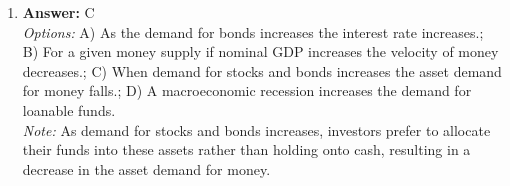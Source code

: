 \documentclass[12pt]{article}
\begin{document}
\begin{enumerate}[label=\arabic*.]
\\ \textit{Note:} When the price of good X, a close substitute for good Z, rises, consumers will shift their demand from good X to good Z, leading to an increase in both the equilibrium price and quantity of good Z.
\item \textbf{Answer:} C
\\ \textit{Options:} A) As the demand for bonds increases the interest rate increases.; B) For a given money supply if nominal GDP increases the velocity of money decreases.; C) When demand for stocks and bonds increases the asset demand for money falls.; D) A macroeconomic recession increases the demand for loanable funds.
\\ \textit{Note:} As demand for stocks and bonds increases, investors prefer to allocate their funds into these assets rather than holding onto cash, resulting in a decrease in the asset demand for money.
\end{enumerate}
\end{document}
